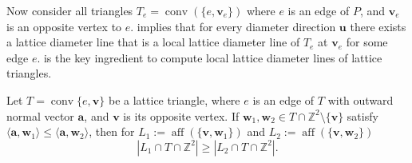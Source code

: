 \documentclass[11pt]{article}
\newcommand{\ba}{\mathbf{a}}
\newcommand{\bu}{\mathbf{u}}
\newcommand{\bv}{\mathbf{v}}
\newcommand{\bw}{\mathbf{w}}
\newcommand{\Z}{\mathbb{Z}}
\DeclareMathOperator{\conv}{conv}
\DeclareMathOperator{\aff}{aff}
\DeclareMathOperator{\spn}{span}
\begin{document}
%      

Now consider all triangles $T_e=\conv(\{e,\bv_e\})$ where $e$ is an edge of $P$, and $\bv_e$ is an opposite vertex to $e$.  implies that for every diameter direction $\bu$ there exists a lattice diameter line that is a local lattice diameter line of $T_e$ at $\bv_e$ for some edge $e$.  is the key ingredient to compute local lattice diameter lines of lattice triangles.

\begin{lemma}\label{lemma:min-gens}
    Let $T = \conv \{e,\bv\}$ be a lattice triangle, where $e$ is an edge of $T$ with outward normal vector $\ba$, and $\bv$ is its opposite vertex. If $\bw_1,\bw_2 \in T \cap \Z^2 \setminus \{\bv\}$ satisfy $\langle \ba, \bw_1 \rangle \leq \langle \ba, \bw_2 \rangle$, then for $L_1:= \aff(\{\bv,\bw_1\})$ and $L_2:= \aff(\{\bv,\bw_2\})$
    \[
    |L_1 \cap T \cap \Z^2| \geq |L_2 \cap T \cap \Z^2|.
    \]
\end{lemma}
\end{document}

